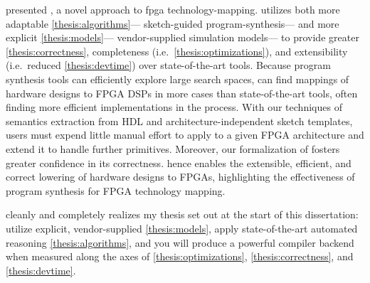 \label{sec:lakeroad-conclusion}

 presented \lr,
  a novel approach to \gls{fpga} \gls{technology-mapping}.
\lr utilizes both more adaptable \cref{thesis:algorithms}---%
  sketch-guided \gls{program-synthesis}---%
  and more explicit \cref{thesis:models}---%
  vendor-supplied simulation models---%
  to provide greater \cref{thesis:correctness},
  completeness (i.e.~\cref{thesis:optimizations}),
  and extensibility (i.e.~reduced \cref{thesis:devtime})
  over state-of-the-art tools.
Because program synthesis tools
  can efficiently explore large search spaces, 
  \lr 
  can find mappings
  of hardware designs
  to FPGA DSPs
  in more cases
  than state-of-the-art tools,
  often finding more efficient implementations
  in the process.
With our techniques
  of semantics extraction
  from HDL
  and architecture-independent sketch templates,
  users must expend little manual effort 
  to apply \lr to
  a given FPGA architecture
  and extend it to handle further primitives.
Moreover, our formalization of \lr
  fosters greater confidence
  in its correctness.
\lr hence enables the 
  extensible, efficient, and correct 
  lowering of hardware designs to FPGAs,
  highlighting the effectiveness
  of program synthesis
  for FPGA technology mapping.


\lr cleanly and completely realizes
  my thesis set out at the start of this dissertation:
  utilize explicit, vendor-supplied \cref{thesis:models},
  apply state-of-the-art automated reasoning 
  \cref{thesis:algorithms},
  and you will produce a 
  powerful compiler backend when measured along the axes of
  \cref{thesis:optimizations},
  \cref{thesis:correctness}, and
  \cref{thesis:devtime}.
  
